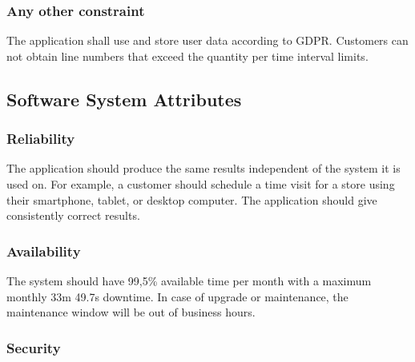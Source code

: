 \subsubsection{Any other constraint}


The application shall use and store user data according to GDPR.
Customers can not obtain line numbers that exceed the quantity per time interval limits.

\subsection{Software System Attributes}

\subsubsection{Reliability}


The application should produce the same results independent of the system it is used on.
For example, a customer should schedule a time visit for a store using their smartphone, tablet, or desktop computer.
The application should give consistently correct results.


\subsubsection{Availability}


The system should have 99,5\% available time per month with a maximum monthly 33m 49.7s downtime.
In case of upgrade or maintenance, the maintenance window will be out of business hours.

\subsubsection{Security}

